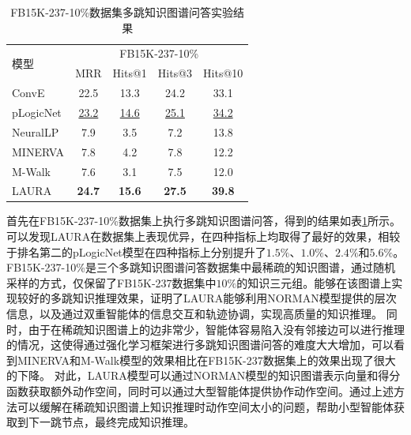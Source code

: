 \documentclass[algorithmlist, AutoFakeBold, AutoFakeSlant, figurelist, tablelist, nomlist, engineering, openany]{seuthesix} %
\begin{document}
\begin{table}[t]
  \centering
  \caption{FB15K-237-10\%数据集多跳知识图谱问答实验结果}
  \begin{tabular*}{0.95\textwidth}{@{\extracolsep{\fill}}lcccc}
    \toprule[1pt]
    \multirow{2}{*}{模型} & \multicolumn{4}{c}{FB15K-237-10\%}   \\
      & MRR & Hits@1 & Hits@3 & Hits@10 \\ \hline
    ConvE & 22.5 & 13.3 & 24.2 & 33.1 \\
    pLogicNet & \underline{23.2} & \underline{14.6} & \underline{25.1} & \underline{34.2} \\
    NeuralLP & 7.9 & 3.5 & 7.2 & 13.8 \\
    MINERVA & 7.8 & 4.2 & 7.8 & 12.2 \\
    M-Walk & 7.6 & 3.1 & 7.5 & 12.0 \\
    LAURA & \textbf{24.7} & \textbf{15.6} & \textbf{27.5} & \textbf{39.8} \\
    \bottomrule[1pt]
  \end{tabular*}
  \label{Experiment2_FB15K-237-10}
\end{table}
首先在FB15K-237-10\%数据集上执行多跳知识图谱问答，得到的结果如表\ref{Experiment2_FB15K-237-10}所示。
可以发现LAURA在数据集上表现优异，在四种指标上均取得了最好的效果，相较于排名第二的pLogicNet模型在四种指标上分别提升了$1.5\%$、$1.0\%$、$2.4\%$和$5.6\%$。
FB15K-237-10\%是三个多跳知识图谱问答数据集中最稀疏的知识图谱，通过随机采样的方式，仅保留了FB15K-237数据集中$10\%$的知识三元组。能够在该图谱上实现较好的多跳知识推理效果，证明了LAURA能够利用NORMAN模型提供的层次信息，以及通过双重智能体的信息交互和轨迹协调，实现高质量的知识推理。
同时，由于在稀疏知识图谱上的边非常少，智能体容易陷入没有邻接边可以进行推理的情况，这使得通过强化学习框架进行多跳知识图谱问答的难度大大增加，可以看到MINERVA和M-Walk模型的效果相比在FB15K-237数据集上的效果出现了很大的下降。
对此，LAURA模型可以通过NORMAN模型的知识图谱表示向量和得分函数获取额外动作空间，同时可以通过大型智能体提供协作动作空间。通过上述方法可以缓解在稀疏知识图谱上知识推理时动作空间太小的问题，帮助小型智能体获取到下一跳节点，最终完成知识推理。
\end{document}

